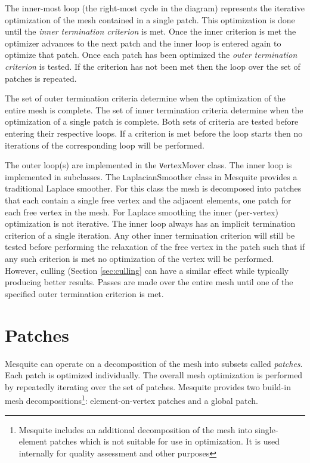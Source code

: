 The inner-most loop (the right-most cycle in the diagram) represents the iterative optimization of the mesh contained in a single patch.  This optimization is done until the {\em inner termination criterion} is met.  Once the inner criterion is met the optimizer advances to the next patch and the inner loop is entered again to optimize that patch.  Once each patch has been optimized the {\em outer termination criterion} is tested.  If the criterion has not been met then the loop over the set of patches is repeated.

The set of outer termination criteria determine when the optimization of the entire mesh is complete.  The set of inner termination criteria determine when the optimization of a single patch is complete.  Both sets of criteria are tested before entering their respective loops.  If a criterion is met before the loop starts then no iterations of the corresponding loop will be performed.

The outer loop(s) are implemented in the {\texttt VertexMover} class.  The inner loop is implemented in subclasses.  The {\texttt LaplacianSmoother} class in Mesquite provides a traditional Laplace smoother.  For this class the mesh is decomposed into patches that each contain a single free vertex and the adjacent elements, one patch for each free vertex in the mesh.  For Laplace smoothing the inner (per-vertex) optimization is not iterative.  The inner loop always has an implicit termination criterion of a single iteration.  Any other inner termination criterion will still be tested before performing the relaxation of the free vertex in the patch such that if any such criterion is met no optimization of the vertex will be performed.  However, culling (Section \ref{sec:culling} can have a similar effect while typically producing better results.  Passes are made over the entire mesh until one of the specified outer termination criterion is met.

\section{Patches \label{sec:patches}}


Mesquite can operate on a decomposition of the mesh into subsets called {\em patches}.  Each patch is optimized individually.  The overall mesh optimization is performed by repeatedly iterating over the set of patches.  Mesquite provides two build-in mesh decompositions\footnote{Mesquite includes an additional decomposition of the mesh into single-element patches which is not suitable for use in optimization.  It is used internally for quality assessment and other purposes}: element-on-vertex patches and a global patch.  

